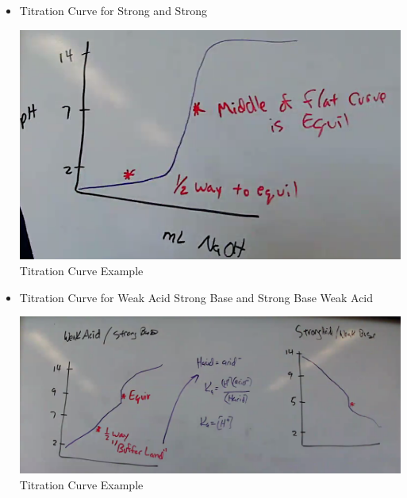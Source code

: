 \documentclass[12pt]{article}
\begin{document}
\begin{itemize}
    \newpage

  \item Titration Curve for Strong and Strong

    \begin{center}
      \includegraphics[width=.8\textwidth]{Figures/TitrationCurveSS.png}\\
      Titration Curve Example
    \end{center}

  \item Titration Curve for Weak Acid Strong Base and Strong Base Weak Acid

    \begin{center}
      \includegraphics[width=.8\textwidth]{Figures/WASB-SAWB.png}\\
      Titration Curve Example
    \end{center}

\end{itemize}
\end{document}
